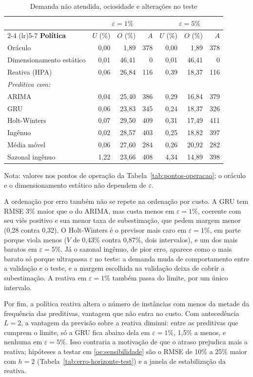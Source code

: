 \begin{table}[htbp]
\centering
\caption{Demanda não atendida, ociosidade e alterações no teste}
\label{tab:uoa}
\footnotesize
\begin{tabular}{l rrr @{\hspace{12pt}} rrr}
\toprule
 & \multicolumn{3}{c}{$\varepsilon = 1\%$} & \multicolumn{3}{c}{$\varepsilon = 5\%$} \\
\cmidrule(lr){2-4} \cmidrule(lr){5-7}
\textbf{Política} & $U$ (\%) & $O$ (\%) & $A$ & $U$ (\%) & $O$ (\%) & $A$ \\
\midrule
Oráculo & 0,00 & 1,89 & 378 & 0,00 & 1,89 & 378 \\
Dimensionamento estático & 0,01 & 46,41 & 0 & 0,01 & 46,41 & 0 \\
Reativa (HPA) & 0,06 & 26,84 & 116 & 0,39 & 18,37 & 116 \\
\textit{Preditiva com:} & & & & & & \\
\quad ARIMA & 0,04 & 25,40 & 386 & 0,29 & 16,84 & 379 \\
\quad GRU & 0,06 & 23,83 & 345 & 0,24 & 18,37 & 326 \\
\quad Holt-Winters & 0,07 & 29,50 & 409 & 0,31 & 17,49 & 411 \\
\quad Ingênuo & 0,02 & 28,57 & 403 & 0,25 & 18,82 & 397 \\
\quad Média móvel & 0,06 & 27,60 & 284 & 0,26 & 20,92 & 282 \\
\quad Sazonal ingênuo & 1,22 & 23,66 & 408 & 4,34 & 14,89 & 398 \\
\bottomrule
\end{tabular}

\smallskip
\parbox{\textwidth}{\footnotesize Nota: valores nos pontos de operação da Tabela~\ref{tab:pontos-operacao}; o oráculo e o dimensionamento estático não dependem de $\varepsilon$.}
\end{table}

A ordenação por erro também não se repete na ordenação por custo. A GRU tem RMSE 3\% maior que o do ARIMA, mas custa menos em $\varepsilon = 1\%$, coerente com seu viés positivo e sua menor taxa de subestimação, que pedem margem menor (0,28 contra 0,32). O Holt-Winters é o previsor mais caro em $\varepsilon = 1\%$, em parte porque viola menos ($V$ de 0,43\% contra 0,87\%, dois intervalos), e um dos mais baratos em $\varepsilon = 5\%$. Já o sazonal ingênuo, de pior erro, aparece como o mais barato só porque ultrapassa $\varepsilon$ no teste: a demanda muda de comportamento entre a validação e o teste, e a margem escolhida na validação deixa de cobrir a subestimação. A reativa em $\varepsilon = 1\%$ também passa do limite, por um único intervalo.

Por fim, a política reativa altera o número de instâncias com menos da metade da frequência das preditivas, vantagem que não entra no custo. Com antecedência $L = 2$, a vantagem da previsão sobre a reativa diminui: entre as preditivas que cumprem o limite, só a GRU fica abaixo dela em $\varepsilon = 1\%$, 1,5\% a menos, e nenhuma em $\varepsilon = 5\%$. Isso contraria a motivação de que o atraso prejudica mais a reativa; hipóteses a testar em \ref{oe:sensibilidade} são o RMSE de 10\% a 25\% maior com $h = 2$ (Tabela~\ref{tab:erro-horizonte-test}) e a janela de estabilização da reativa.
